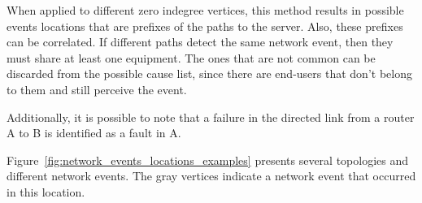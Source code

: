 When applied to different zero indegree vertices,
this method results in possible events locations that are prefixes of
the paths to the server.
Also, these prefixes can be correlated.
If different paths detect the same network
event, then they must share at least one equipment. The
ones that are not common can be discarded from the possible cause list, since
there are end-users that don't belong to them and still perceive the event.

Additionally, it is possible to note that a failure in the directed link from a
router A to B is identified as a fault in A.

Figure~\ref{fig:network_events_locations_examples} presents several topologies
and different network events. The gray vertices indicate a network event
that occurred in this location.

